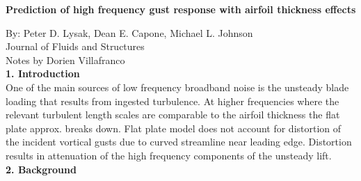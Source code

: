 \documentclass{article}
\begin{document}
\begin{center}
\noindent \textbf{Prediction of high frequency gust response with airfoil thickness effects}\\
\end{center}
By: Peter D. Lysak, Dean E. Capone, Michael L. Johnson\\
Journal of Fluids and Structures\\
Notes by Dorien Villafranco\\

\noindent \textbf{1. Introduction} \\
One of the main sources of low frequency broadband noise is the unsteady blade loading that results from ingested turbulence. At higher frequencies where the relevant turbulent length scales are comparable to the airfoil thickness the flat plate approx. breaks down. Flat plate model does not account for distortion of the incident vortical gusts due to curved streamline near leading edge. Distortion results in attenuation of the high frequency components of the unsteady lift. \\

\noindent \textbf{2. Background}\\
\end{document}
